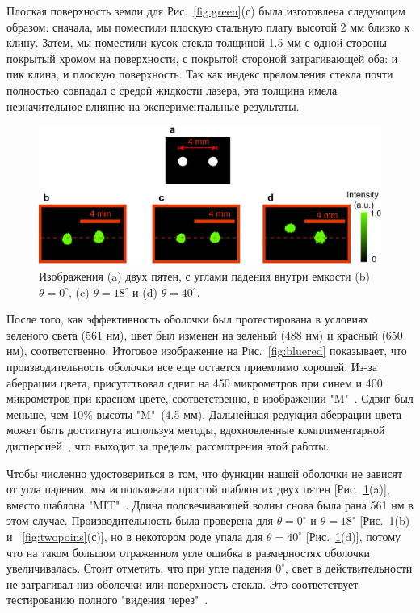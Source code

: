 \documentclass[a4paper, 12pt]{article}
\begin{document}
Плоская поверхность земли для Рис.~\ref{fig:green}(с) была изготовлена 
следующим образом: сначала, мы поместили плоскую стальную плату высотой 2 мм
близко к клину. Затем, мы поместили кусок стекла толщиной 1.5 мм с одной 
стороны покрытый хромом на поверхности, с покрытой стороной затрагивающей
оба: и пик клина, и плоскую поверхность. Так как индекс преломления стекла 
почти полностью совпадал с средой жидкости лазера, эта толщина имела 
незначительное влияние на экспериментальные результаты.

\begin{figure}
\begin{centering}
\includegraphics[width=0.8\columnwidth,draft=false]{Fig_5}
\caption{\label{fig:twopoints} Изображения (a) двух пятен, с углами 
падения внутри емкости 
(b) $\theta=0^\circ$, (c) $\theta=18^\circ$ и (d) $\theta=40^\circ$.}
\end{centering}
\end{figure}

После того, как эффективность оболочки был протестирована в условиях зеленого
света (561 нм), цвет был изменен на зеленый (488 нм) и красный (650 нм), 
соответственно. Итоговое изображение на Рис.~\ref{fig:bluered} показывает, что
производительность оболочки все еще остается приемлимо хорошей. Из-за аберрации
цвета, присутствовал сдвиг на 450 микрометров при синем и 400 микрометров при
красном цвете, соответственно, в изображении "M"\ . Сдвиг был меньше, чем 
10\% высоты "M"\ (4.5 мм). Дальнейшая редукция аберрации цвета может быть
достигнута используя методы, вдохновленные комплиментарной 
дисперсией~\cite{lensabberation},
что выходит за пределы рассмотрения этой работы.

Чтобы численно удостовериться в том, что функции нашей оболочки не зависят от
угла падения, мы использовали простой шаблон их двух пятен 
[Рис.~\ref{fig:twopoints}(a)], вместо шаблона "MIT"\ . Длина подсвечивающей
волны снова была рана 561 нм в этом случае. Производительность была проверена
для $\theta = 0^\circ$ и $\theta = 18^\circ$ [Рис.~\ref{fig:twopoints}(b) 
и ~\ref{fig:twopoins}(с)], но в некотором роде упала для $\theta = 40^\circ$
[Рис.~\ref{fig:twopoints}(d)], потому что на таком большом отраженном угле
ошибка в размерностях оболочки увеличивалась. Стоит отметить, что при угле
падения $0^\circ$, свет в действительности не затрагивал низ оболочки или
поверхность стекла. Это соответствует тестированию полного "видения через"\ .
\end{document}

